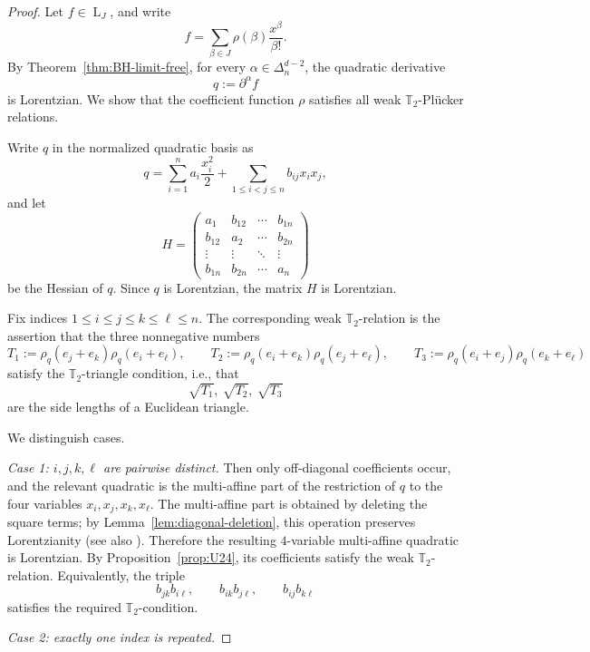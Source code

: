 \documentclass[12pt]{amsart}
\theoremstyle{definition}
\newcommand{\1}{\mathbf{1}}
\DeclareMathOperator{\upL}{L}   %
\newcommand\T{{\mathbb T}}
\begin{document}
\begin{proof}
Let $f\in \upL_J$, and write
\[
f=\sum_{\beta\in J}\rho(\beta)\frac{x^\beta}{\beta!}.
\]
By Theorem~\ref{thm:BH-limit-free}, for every $\alpha\in\Delta_n^{d-2}$, the quadratic derivative
\[
q := \partial^\alpha f
\]
is Lorentzian. We show that the coefficient function $\rho$ satisfies all weak
$\mathbb T_2$-Plücker relations.

Write $q$ in the normalized quadratic basis as
\[
q
=
\sum_{i=1}^n a_i \frac{x_i^2}{2}
+
\sum_{1\le i<j\le n} b_{ij} x_i x_j,
\]
and let
\[
H=
\begin{pmatrix}
a_1 & b_{12} & \cdots & b_{1n}\\
b_{12} & a_2 & \cdots & b_{2n}\\
\vdots & \vdots & \ddots & \vdots\\
b_{1n} & b_{2n} & \cdots & a_n
\end{pmatrix}
\]
be the Hessian of $q$. Since $q$ is Lorentzian, the matrix $H$ is Lorentzian.

Fix indices $1\le i\le j\le k\le \ell\le n$. The corresponding weak $\T_2$-relation is
the assertion that the three nonnegative numbers
\[
T_1:=\rho_q(e_j+e_k)\rho_q(e_i+e_\ell),\qquad
T_2:=\rho_q(e_i+e_k)\rho_q(e_j+e_\ell),\qquad
T_3:=\rho_q(e_i+e_j)\rho_q(e_k+e_\ell)
\]
satisfy the $\T_2$-triangle condition, i.e., that
\[
\sqrt{T_1},\ \sqrt{T_2},\ \sqrt{T_3}
\]
are the side lengths of a Euclidean triangle.

We distinguish cases.

\smallskip

\emph{Case 1: $i,j,k,\ell$ are pairwise distinct.}
Then only off-diagonal coefficients occur, and the relevant quadratic is the multi-affine
part of the restriction of $q$ to the four variables $x_i,x_j,x_k,x_\ell$. 
The multi-affine part is obtained by deleting the square terms; by
Lemma~\ref{lem:diagonal-deletion}, this operation preserves Lorentzianity (see also \cite[Corollary 3.5]{Branden-Huh20}). Therefore 
the resulting $4$-variable multi-affine quadratic is Lorentzian.
By Proposition~\ref{prop:U24}, its coefficients satisfy the weak $\T_2$-relation.
Equivalently, the triple
\[
b_{jk}b_{i\ell},\qquad b_{ik}b_{j\ell},\qquad b_{ij}b_{k\ell}
\]
satisfies the required $\T_2$-condition.

\smallskip

\emph{Case 2: exactly one index is repeated.}


\end{proof}
\end{document}
